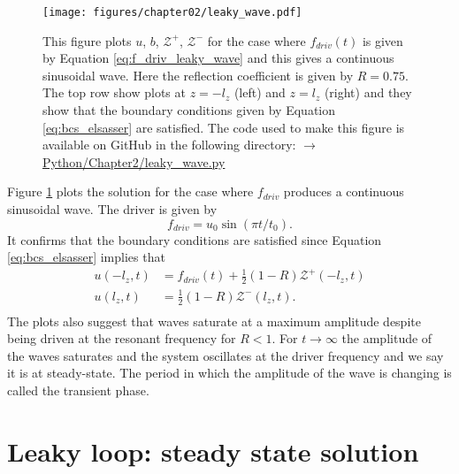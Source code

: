 \begin{figure}
    \centering
    \vspace{-30pt}
    \texttt{[image: figures/chapter02/leaky\_wave.pdf]}
    \vspace{-10pt}
    \caption{This figure plots $u$, $b$, $\mathcal{Z}^{+}$, $\mathcal{Z^{-}}$ for the case where $f_{driv}(t)$ is given by Equation \eqref{eq:f_driv_leaky_wave} and this gives a continuous sinusoidal wave. Here the reflection coefficient is given by $R=0.75$. The top row show plots at $z=-l_z$ (left) and $z=l_z$ (right) and they show that the boundary conditions given by Equation \eqref{eq:bcs_elsasser} are satisfied. The code used to make this figure is available on GitHub in the following directory:\newline
    \href{https://github.com/aleksyprok/apkp_thesis/blob/main/Python/Chapter2/leaky_wave.py}{$\rightarrow$ Python/Chapter2/leaky\_wave.py}}
    \vspace{-30pt}
    \label{fig:leaky_wave}
\end{figure}

Figure \ref{fig:leaky_wave} plots the solution for the case where $f_{driv}$ produces a continuous sinusoidal wave. The driver is given by
\begin{equation}
    \label{eq:f_driv_leaky_wave}
    f_{driv} = u_0 \sin(\pi t / t_0).
\end{equation}
It confirms that the boundary conditions are satisfied since Equation \eqref{eq:bcs_elsasser} implies that
\begin{equation}
\begin{aligned}
    u(-l_z,t) &= f_{driv}(t)+\frac{1}{2}(1-R)\mathcal{Z}^+(-l_z,t) \\
    u(l_z,t) &= \frac{1}{2}(1-R)\mathcal{Z}^-(l_z,t). \\
\end{aligned}
\end{equation}
The plots also suggest that waves saturate at a maximum amplitude despite being driven at the resonant frequency for $R<1$. For $t\rightarrow \infty$ the amplitude of the waves saturates and the system oscillates at the driver frequency and we say it is at steady-state. The period in which the amplitude of the wave is changing is called the transient phase.

\section{Leaky loop: steady state solution}
\label{sec:leaky_loop_steady_state_solution}

